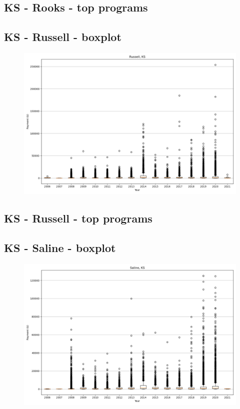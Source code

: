 \subsection*{KS - Rooks - top programs}

\newpage
\subsection*{KS - Russell - boxplot}
\begin{figure}[h]
\centering
\includegraphics[width=7in]{../output/boxplots/counties/Russell-KS_boxplot.png}
\end{figure}


\subsection*{KS - Russell - top programs}

\newpage
\subsection*{KS - Saline - boxplot}
\begin{figure}[h]
\centering
\includegraphics[width=7in]{../output/boxplots/counties/Saline-KS_boxplot.png}
\end{figure}


